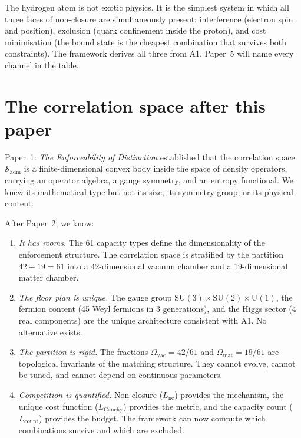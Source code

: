 \documentclass[11pt]{article}
\newcommand{\SU}{\mathrm{SU}}
\newcommand{\U}{\mathrm{U}}
\begin{document}
The hydrogen atom is not exotic physics.  It is the simplest system in
which all three faces of non-closure are simultaneously present:
interference (electron spin and position), exclusion (quark confinement
inside the proton), and cost minimisation (the bound state is the cheapest
combination that survives both constraints).  The framework derives all
three from A1.  Paper~5 will name every channel in the table.


\section{The correlation space after this paper}
\label{sec:corr_space}

Paper~1: \emph{The Enforceability of Distinction} established that the correlation space $\mathcal{S}_{\mathrm{adm}}$ is a finite-dimensional convex body inside the space of density operators, carrying an operator algebra, a gauge symmetry, and an entropy functional.  We knew its mathematical type but not its size, its symmetry group, or its physical content.

After Paper~2, we know:

\begin{enumerate}
\item \textit{It has rooms.}  The 61 capacity types define the dimensionality of the enforcement structure.  The correlation space is stratified by the partition $42 + 19 = 61$ into a 42-dimensional vacuum chamber and a 19-dimensional matter chamber.

\item \textit{The floor plan is unique.}  The gauge group $\SU(3) \times \SU(2) \times \U(1)$, the fermion content (45 Weyl fermions in 3 generations), and the Higgs sector (4 real components) are the unique architecture consistent with A1.  No alternative exists.

\item \textit{The partition is rigid.}  The fractions $\Omega_{\mathrm{vac}} = 42/61$ and $\Omega_{\mathrm{mat}} = 19/61$ are topological invariants of the matching structure.  They cannot evolve, cannot be tuned, and cannot depend on continuous parameters.

\item \textit{Competition is quantified.}  Non-closure ($L_{\mathrm{nc}}$) provides the mechanism, the unique cost function ($L_{\mathrm{Cauchy}}$) provides the metric, and the capacity count ($L_{\mathrm{count}}$) provides the budget.  The framework can now compute which combinations survive and which are excluded.
\end{enumerate}
\end{document}
